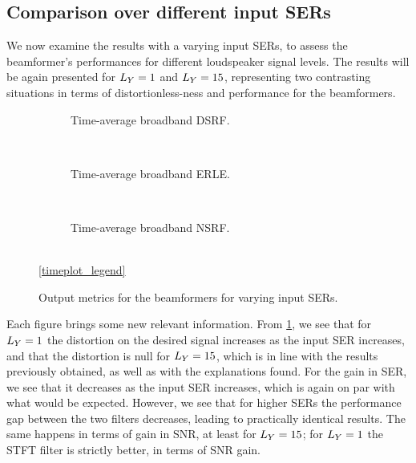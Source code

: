 \subsection{Comparison over different input SERs}

We now examine the results with a varying input SERs, to assess the beamformer's performances for different loudspeaker signal levels. The results will be again presented for $\Ly = 1$ and $\Ly = 15$, representing two contrasting situations in terms of distortionless-ness and performance for the beamformers.


\begin{figure}[!t]
	\centering
	\begin{subfigure}{\textwidth}
		\centering
		
		\caption{Time-average broadband DSRF.}
		\label{subfig:lineplot__DSRF__iSER_var__err_0}
	\end{subfigure}\\[1em]
	\begin{subfigure}{\textwidth}
		\centering
		
		\caption{Time-average broadband ERLE.}
		\label{subfig:lineplot__gSER__iSER_var__err_0}
	\end{subfigure}\\[1em]
	\begin{subfigure}{\textwidth}
		\centering
		
		\caption{Time-average broadband NSRF.}
		\label{subfig:lineplot__gSNR__iSER_var__err_0}
	\end{subfigure}\\[1em]
	\ref*{timeplot_legend}
	\caption{Output metrics for the beamformers for varying input SERs.}
	\label{fig:lineplot__iSER_var__Ly_1__err_0}
\end{figure}

Each figure brings some new relevant information. From \cref{subfig:lineplot__DSRF__iSER_var__err_0}, we see that for $\Ly = 1$ the distortion on the desired signal increases as the input SER increases, and that the distortion is null for $\Ly = 15$, which is in line with the results previously obtained, as well as with the explanations found. For the gain in SER, we see that it decreases as the input SER increases, which is again on par with what would be expected. However, we see that for higher SERs the performance gap between the two filters decreases, leading to practically identical results. The same happens in terms of gain in SNR, at least for $\Ly = 15$; for $\Ly = 1$ the STFT filter is strictly better, in terms of SNR gain.

